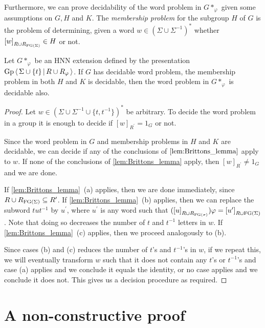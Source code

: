 Furthermore, we can prove decidability of the word problem in $G\ast_\varphi$ given some
assumptions on $G, H$ and $K$. The \emph{membership problem} for the subgroup $H$ of $G$ is the
problem of determining, given a word $w\in {(\Sigma \cup \Sigma^{-1})}^\ast$ whether
${[w]}_{R\cup R_{\textrm{FG}(\Sigma)}} \in H$ or not.

\begin{lemma}%
  \label{lem:HNN_word_problem}
  Let $G\ast_\varphi$ be an HNN extension defined by the presentation
  $\textrm{Gp}\left\langle\, \Sigma \cup\{t\} \,\middle|\, R\cup R_\varphi \,\right\rangle$. If $G$ has decidable word problem, the
  membership problem in both $H$ and $K$ is decidable, then the word problem in $G\ast_\varphi$ is decidable also.
\end{lemma}
\begin{proof}
  Let $w\in {(\Sigma\cup \Sigma^{-1}\cup\{t, t^{-1}\})}^\ast$ be arbitrary. To decide the word
  problem in a group it is enough to decide if ${[w]}_{R^\prime} = 1_G$ or not.

  Since the word problem in $G$ and membership problems in $H$ and $K$ are decidable, we can
  decide if any of the conclusions of $\cref{lem:Brittons_lemma}$ apply to $w$.
  If none of the conclusions of \cref{lem:Brittons_lemma} apply, then ${[w]}_{R^\prime}\neq 1_G$ and we are done.

  If \cref{lem:Brittons_lemma}~(a) applies, then we are done immediately,
  since $R\cup R_{\textrm{FG}(\Sigma)} \subseteq R^\prime$.
  If \cref{lem:Brittons_lemma}~(b) applies, then we can replace the subword $tut^{-1}$
  by $u^\prime$, where $u^\prime$ is any word such that
  $({[u]}_{R\cup R_{\textrm{FG}(\sigma)}})\varphi = {[u^\prime]}_{R\cup \textrm{FG}(\Sigma)}$.
  Note that doing so decreases the number of $t$ and $t^{-1}$ letters in $w$.
  If \cref{lem:Brittons_lemma}~(c) applies, then we proceed analogously to (b).

  Since cases (b) and (c) reduces the number of $t$'s and $t^{-1}$'s in $w$, if we repeat this,
  we will eventually transform $w$ such that it does not contain any $t$'s or $t^{-1}$'s and case
  (a) applies and we conclude it equals the identity, or no case applies and we conclude it does
  not. This gives us a decision procedure as required.
\end{proof}

\section{A non-constructive proof}

